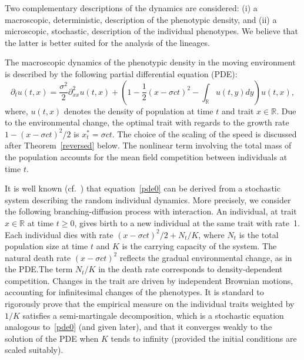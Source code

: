 \documentclass[AHL,Unicode,longabstracts,published]{cedram}
\newcommand*\R{\mathbb{R}}
\begin{document}
Two complementary descriptions of the dynamics are considered: (i) a macroscopic, deterministic, description of the phenotypic density, and (ii) a microscopic, stochastic, description of the individual phenotypes. We believe that the latter is better suited for the analysis of the lineages.



The macroscopic dynamics of the phenotypic density in the moving environment is described by the following partial differential equation (PDE):
\begin{equation}\label{pde0}
\partial_{t}u(t,x)=\frac{\sigma^2}{2}\partial^2_{xx} u(t,x)+\left(1-\frac{1}{2}(x-\sigma ct)^2-\int_{\R}u(t,y)dy \right)u(t,x),
\end{equation}
where, $u(t,x)$ denotes the density of population at time $t$ and trait $x\in \R$. Due to the environmental change, the optimal trait with regards to the growth rate $1-(x-\sigma ct)^2/2$ is $x^*_t=\sigma c t$. The choice of the scaling of the speed is discussed after Theorem~\ref{reversed} below. The nonlinear term involving the total mass of the population accounts for the mean field competition between individuals at time $t$.


It is well known (cf.~\cite{champagnat_microscopic_2006,champagnatferrieremeleard_stochmodels,fourniermeleard}) that equation~\eqref{pde0} can be derived from a stochastic system describing the random individual dynamics. More precisely, we consider the following branching-diffusion process with interaction. An individual, at trait $x\in \R$ at time $t\geq 0$, gives birth to a new individual at the same trait with rate~1. Each individual dies with rate $(x-\sigma ct)^2/2+N_t/K$, where $N_t$ is the total population size at time $t$ and $K$ is the carrying capacity of the system. The natural death rate $(x-\sigma ct)^2$ reflects the gradual environmental change, as in the PDE.\linebreak The term $N_t/K$ in the death rate corresponds to density-dependent competition. Changes in the trait are driven by independent Brownian motions, accounting for infinitesimal changes of the phenotypes. It is standard to rigorously prove that the empirical measure on the individual traits weighted by $1/K$ satisfies a semi-martingale decomposition, which is a stochastic equation analogous to~\eqref{pde0} (and given later), and that it converges weakly to the solution of the PDE when $K$ tends to infinity (provided the initial conditions are scaled suitably).
\end{document}
